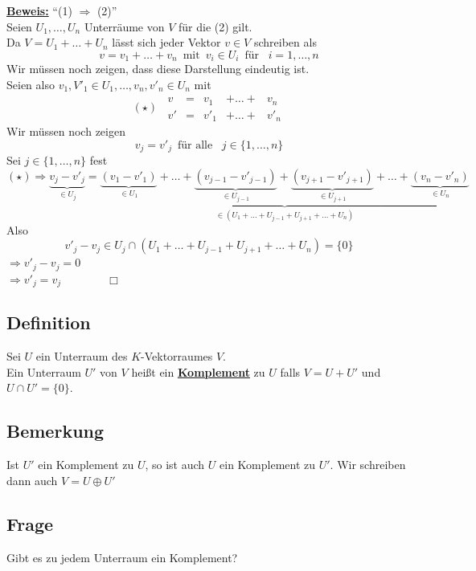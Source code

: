 \newpage 
\underline{\textbf{Beweis:}} ``(1) $\Rightarrow$ (2)'' \\
Seien $U_1, \ldots , U_n$ Unterräume von $V$ für die (2) gilt. \\
Da $V=U_1 + \ldots + U_n$ lässt sich jeder Vektor $v \in V$ schreiben als
\[
	v = v_1 + \ldots  + v_n \enspace \text{mit} \enspace v_i \in U_i \enspace \text{für } \enspace i=1, \ldots , n
\]
Wir müssen noch zeigen, dass diese Darstellung eindeutig ist. \\
Seien also $v_1, V'_1 \in U_1, \ldots , v_n, v'_n \in U_n $ mit
\[
	( \star) \enspace \begin{matrix}
		v & = & v_1 & + \ldots + &  v_n \\
		v' & = & v'_1 & + \ldots  + & v'_n
	\end{matrix}
\]
Wir müssen noch zeigen 
\[
	v_j = v'_j \enspace \text{für alle } \enspace j \in \{ 1, \ldots  , n\}
\]
Sei $j \in \{1, \ldots , n \}$ fest \\
\[
	(\star) \Rightarrow \underbrace{v_j - v'_j}_{\in U_j} = \underbrace{\underbrace{(v_1 -v'_1)}_{\in U_1} + \ldots + 
	\underbrace{(v_{j-1}- v'_{j-1})}_{\in U_{j-1}} + \underbrace{(v_{j+1}- v'_{j+1})}_{\in U_{j+1}} + \ldots +
	\underbrace{(v_n - v'_n)}_{\in U_n}}_{ \in (U_1 + \ldots + U_{j-1} + U_{j+1} + \ldots + U_n) 
	}
\]
Also 
\[
	v'_j -v_j \in U_j \cap (U_1 + \ldots + U_{j-1} + U_{j+1} + \ldots  + U_n) = \{ 0 \}
\]
$\Rightarrow v'_j -v_j = 0$ \\
$\Rightarrow v'_j = v_j \quad \quad \quad \quad \Box$ \\ 
\subsection{Definition} %
\label{sub:definition}
Sei $U$ ein Unterraum des $K$-Vektorraumes $V$.\\
Ein Unterraum $U'$ von $V$ heißt ein \underline{\textbf{Komplement}} zu $U$ falls $V = U +U'$ und $U \cap U' = \{0\}$.

\subsection{Bemerkung} %
\label{sub:bemerkung}
Ist $U'$ ein Komplement zu $U$, so ist auch $U$ ein Komplement zu $U'$. Wir schreiben dann auch $V= U \oplus U'$

\subsection{Frage} %
\label{sub:frage}
Gibt es zu jedem Unterraum ein Komplement? 

